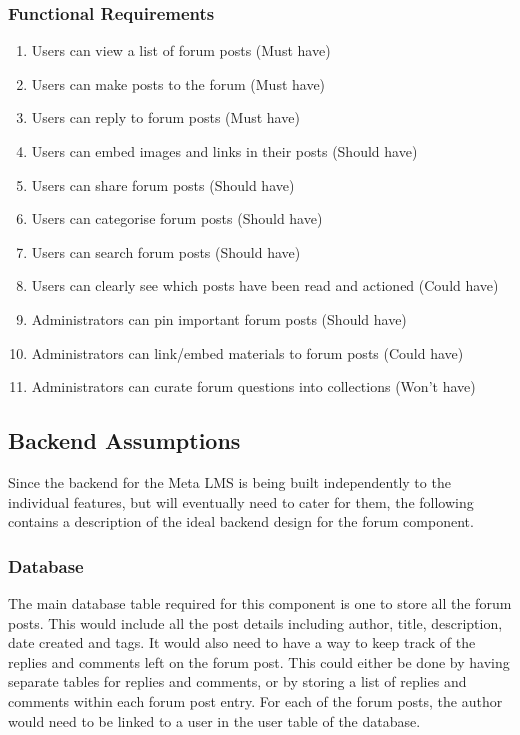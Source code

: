 \subsubsection{Functional Requirements}
\begin{enumerate}
    \item Users can view a list of forum posts (Must have)
    \item Users can make posts to the forum (Must have)
    \item Users can reply to forum posts (Must have)
    \item Users can embed images and links in their posts (Should have)
    \item Users can share forum posts (Should have)
    \item Users can categorise forum posts (Should have)
    \item Users can search forum posts (Should have)
    \item Users can clearly see which posts have been read and actioned (Could have)
    \item Administrators can pin important forum posts (Should have)
    \item Administrators can link/embed materials to forum posts (Could have)
    \item Administrators can curate forum questions into collections (Won't have)
\end{enumerate}

\newpage

\subsection{Backend Assumptions}
Since the backend for the Meta LMS is being built independently to the individual features, but will eventually need to cater for them, the following contains a description of the ideal backend design for the forum component.

\subsubsection{Database}
The main database table required for this component is one to store all the forum posts.
This would include all the post details including author, title, description, date created and tags.
It would also need to have a way to keep track of the replies and comments left on the forum post.
This could either be done by having separate tables for replies and comments, or by storing a list of replies and comments within each forum post entry.
For each of the forum posts, the author would need to be linked to a user in the user table of the database.

